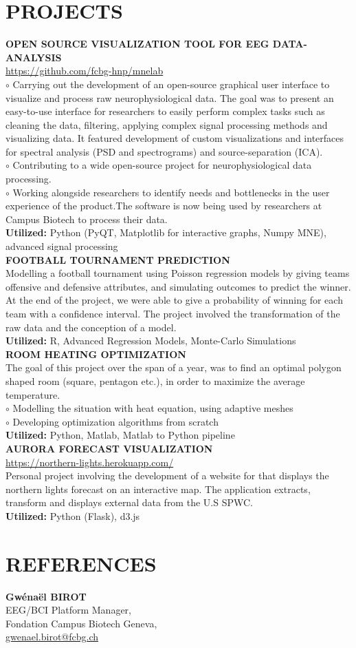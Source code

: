 \documentclass[]{cv-style}          %
\begin{document}
\section{PROJECTS}
  \textbf{OPEN SOURCE VISUALIZATION TOOL FOR EEG DATA-ANALYSIS}\\
  \url{https://github.com/fcbg-hnp/mnelab}\\
  $\circ$ Carrying out the development of an open-source graphical user interface to visualize and process raw neurophysiological data. The goal was to present an easy-to-use interface for researchers to easily perform complex tasks such as cleaning the data, filtering, applying complex signal processing methods and visualizing data. It featured development of custom visualizations and interfaces for spectral analysis (PSD and spectrograms) and source-separation (ICA).\\
  $\circ$ Contributing to a wide open-source project for neurophysiological data processing.\\
  $\circ$ Working alongside researchers to identify needs and bottlenecks in the user experience of the product.The software is now being used by researchers at Campus Biotech to process their data.\\
  \textbf{Utilized:} Python (PyQT, Matplotlib for interactive graphs, Numpy MNE), advanced signal processing\\[0.4cm]
  \textbf{FOOTBALL TOURNAMENT PREDICTION}\\
  Modelling a football tournament using Poisson regression models by giving teams offensive and defensive attributes, and simulating outcomes to predict the winner. At the end of the project, we were able to give a probability of winning for each team with a confidence interval. The project involved the transformation of the raw data and the conception of a model.\\
  \textbf{Utilized:} R, Advanced Regression Models, Monte-Carlo Simulations\\[0.4cm]
 \textbf{ROOM HEATING OPTIMIZATION}\\
 The goal of this project over the span of a year, was to find an optimal polygon shaped room (square, pentagon etc.), in order to maximize the average temperature.\\
 $\circ$ Modelling the situation with heat equation, using adaptive meshes\\
 $\circ$ Developing optimization algorithms from scratch\\
 \textbf{Utilized:} Python, Matlab, Matlab to Python pipeline\\[0.4cm]
  \textbf{AURORA FORECAST VISUALIZATION}\\
  \url{https://northern-lights.herokuapp.com/}\\
  Personal project involving the development of a website for that displays the northern lights forecast on an interactive map. The application extracts, transform and displays external data from the U.S SPWC.\\
  \textbf{Utilized:} Python (Flask), d3.js\\[0.4cm]
\section{REFERENCES}
    \textbf{Gwénaël BIROT} \\
    EEG/BCI Platform Manager, \\
    Fondation Campus Biotech Geneva,\\
    \url{gwenael.birot@fcbg.ch}
%
\end{document}

